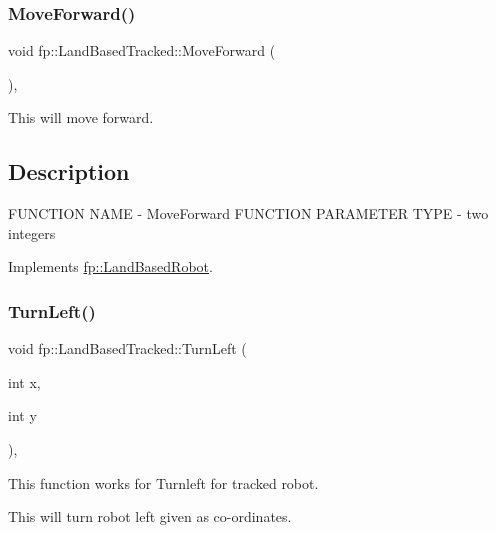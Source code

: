 \subsubsection{\texorpdfstring{Move\+Forward()}{MoveForward()}}
{\footnotesize\ttfamily void fp\+::\+Land\+Based\+Tracked\+::\+Move\+Forward (\begin{DoxyParamCaption}{ }\end{DoxyParamCaption})\hspace{0.3cm}{\ttfamily [override]}, {\ttfamily [virtual]}}



This will move forward. 

\hypertarget{main_8cpp_Description}{}\subsection{Description}\label{main_8cpp_Description}
F\+U\+N\+C\+T\+I\+ON N\+A\+ME -\/ Move\+Forward F\+U\+N\+C\+T\+I\+ON P\+A\+R\+A\+M\+E\+T\+ER T\+Y\+PE -\/ two integers 

Implements \hyperlink{classfp_1_1_land_based_robot_a5df828c5d6c1f7fb4c7b68f53d9c6080}{fp\+::\+Land\+Based\+Robot}.

\mbox{\label{classfp_1_1_land_based_tracked_aab40e1a48e5142491f02b2936c4cacc3}} 
\subsubsection{\texorpdfstring{Turn\+Left()}{TurnLeft()}}
{\footnotesize\ttfamily void fp\+::\+Land\+Based\+Tracked\+::\+Turn\+Left (\begin{DoxyParamCaption}\item[{int}]{x,  }\item[{int}]{y }\end{DoxyParamCaption})\hspace{0.3cm}{\ttfamily [override]}, {\ttfamily [virtual]}}



This function works for Turnleft for tracked robot. 

This will turn robot left given as co-\/ordinates.


